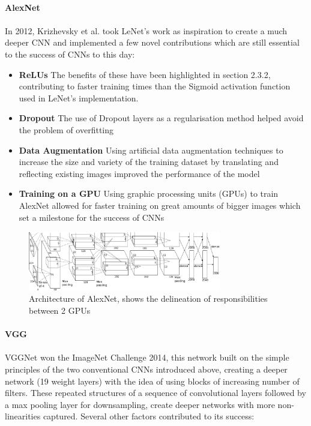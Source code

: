 \documentclass{article}
\begin{document}
\paragraph{AlexNet}
\paragraph{}
In 2012, Krizhevsky et al.\cite{10.5555/2999134.2999257} took LeNet's work as inspiration to create a much deeper CNN and implemented a few novel contributions which are still essential to the success of CNNs to this day:
\begin{itemize}
    \item \textbf{ReLUs} The benefits of these have been highlighted in section 2.3.2, contributing to faster training times than the Sigmoid activation function used in LeNet's implementation.
    \item \textbf{Dropout} The use of Dropout layers as a regularisation method helped avoid the problem of overfitting
    \item \textbf{Data Augmentation} Using artificial data augmentation techniques to increase the size and variety of the training dataset by translating and reflecting existing images improved the performance of the model
     \item \textbf{Training on a GPU} Using graphic processing units (GPUs) to train AlexNet allowed for faster training on great amounts of bigger images which set a milestone for the success of CNNs
\end{itemize}

    \begin{figure}[hbt!]
        \centering
        \includegraphics[width=0.75\textwidth]{alexnet_arch.png}
        \caption{Architecture of AlexNet, shows the delineation of responsibilities between 2 GPUs \cite{10.5555/2999134.2999257}}
    \end{figure}


\paragraph{VGG}
\paragraph{}
VGGNet \cite{simonyan2014deep} won the ImageNet Challenge 2014, this network built on the simple principles of the two conventional CNNs introduced above, creating a deeper network (19 weight layers) with the idea of using blocks of increasing number of filters. These repeated structures of a sequence of convolutional layers followed by a max pooling layer for downsampling, create deeper networks with more non-linearities captured. Several other factors contributed to its success:
\end{document}
